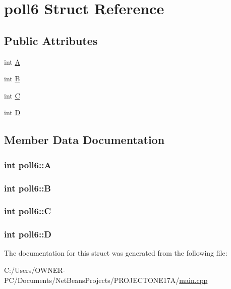 \hypertarget{structpoll6}{\section{poll6 Struct Reference}
\label{structpoll6}
}
\subsection*{Public Attributes}
\begin{DoxyCompactItemize}
\item 
int \hyperlink{structpoll6_ac409e0060ed0b000c7f8eddbb8709a0f}{A}
\item 
int \hyperlink{structpoll6_af128dde70690b0ce954234e709ef6b26}{B}
\item 
int \hyperlink{structpoll6_ac3ec65899881deb149bb17332b0189c4}{C}
\item 
int \hyperlink{structpoll6_a44b1122e4faad5c06b349ee764624809}{D}
\end{DoxyCompactItemize}


\subsection{Member Data Documentation}
\hypertarget{structpoll6_ac409e0060ed0b000c7f8eddbb8709a0f}{
\subsubsection[{A}]{\setlength{\rightskip}{0pt plus 5cm}int poll6\+::\+A}}\label{structpoll6_ac409e0060ed0b000c7f8eddbb8709a0f}
\hypertarget{structpoll6_af128dde70690b0ce954234e709ef6b26}{
\subsubsection[{B}]{\setlength{\rightskip}{0pt plus 5cm}int poll6\+::\+B}}\label{structpoll6_af128dde70690b0ce954234e709ef6b26}
\hypertarget{structpoll6_ac3ec65899881deb149bb17332b0189c4}{
\subsubsection[{C}]{\setlength{\rightskip}{0pt plus 5cm}int poll6\+::\+C}}\label{structpoll6_ac3ec65899881deb149bb17332b0189c4}
\hypertarget{structpoll6_a44b1122e4faad5c06b349ee764624809}{
\subsubsection[{D}]{\setlength{\rightskip}{0pt plus 5cm}int poll6\+::\+D}}\label{structpoll6_a44b1122e4faad5c06b349ee764624809}


The documentation for this struct was generated from the following file\+:\begin{DoxyCompactItemize}
\item 
C\+:/\+Users/\+O\+W\+N\+E\+R-\/\+P\+C/\+Documents/\+Net\+Beans\+Projects/\+P\+R\+O\+J\+E\+C\+T\+O\+N\+E17\+A/\hyperlink{main_8cpp}{main.\+cpp}\end{DoxyCompactItemize}
